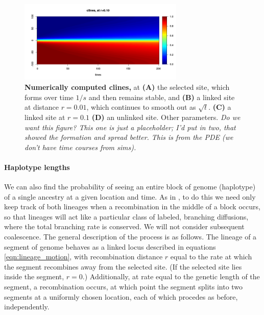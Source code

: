 \documentclass[12pt]{article}
\newcommand{\plr}[1]{{\em \color{blue} #1}}
\begin{document}
\begin{figure}
    \begin{center}
       \includegraphics[width=0.7\textwidth]{figs/example_cline}
    \end{center}
    \caption{
        \textbf{Numerically computed clines,} at
        \textbf{(A)} the selected site, which forms over time $1/s$ and then remains stable, and
        \textbf{(B)} a linked site at distance $r=0.01$, which continues to smooth out as $\sqrt{t}$.
        \textbf{(C)} a linked site at $r=0.1$
        \textbf{(D)} an unlinked site.
        Other parameters.
       \plr{Do we want this figure? This one is just a placeholder; I'd put in two, that showed the formation and spread better.
       This is from the PDE (we don't have time courses from sims).}
        \label{fig:pde_clines}
    }
\end{figure}


\paragraph{Haplotype lengths}
We can also find the probability of seeing an entire block of genome (haplotype)
of a single ancestry at a given location and time.
As in \citet{sedghifar},
to do this we need only keep track of both lineages when a recombination in the middle of a block occurs,
so that lineages will act like a particular class of labeled, branching diffusions,
where the total branching rate is conserved.
We will not consider subsequent coalescence.
The general description of the process is as follows.
The lineage of a segment of genome behaves as a linked locus described in equations \eqref{eqn:lineage_motion},
with recombination distance $r$ equal to the rate at which the segment recombines away from the selected site.
(If the selected site lies inside the segment, $r=0$.)
Additionally, at rate equal to the genetic length of the segment,
a recombination occurs, at which point the segment splits into two segments at a uniformly chosen location,
each of which procedes as before, independently.
\end{document}
